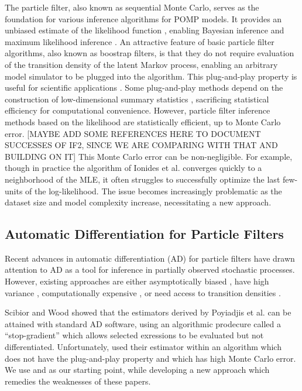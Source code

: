 \documentclass[9pt,twocolumn,twoside]{pnas-new}
\begin{document}
The particle filter, also known as sequential Monte Carlo, serves as the foundation for various inference algorithms for POMP models.
It provides an unbiased estimate of the likelihood function  \cite{delMoral04}, enabling Bayesian inference \cite{andrieu10,chopin13} and maximum likelihood inference \citep{ionides06-pnas,ionides15}.
An attractive feature of basic particle filter algorithms, also known as boostrap filters, is that they do not require evaluation of the transition density of the latent Markov process, enabling an arbitrary model simulator to be plugged into the algorithm.
This plug-and-play property is useful for scientific applications \cite{he10}.
Some plug-and-play methods depend on the construction of low-dimensional summary statistics \cite{wood10,toni09}, sacrificing statistical efficiency for computational convenience.
However, particle filter inference methods based on the likelihood are statistically efficient, up to Monte Carlo error.
[MAYBE ADD SOME REFERENCES HERE TO DOCUMENT SUCCESSES OF IF2, SINCE WE ARE COMPARING WITH THAT AND BUILDING ON IT]
This Monte Carlo error can be non-negligible.
For example, though in practice the algorithm of Ionides et al. \cite{ionides15} converges quickly to a neighborhood of the MLE, it often struggles to successfully optimize the last few-units of the log-likelihood.
The issue becomes increasingly problematic as the dataset size and model complexity increase, necessitating a new approach.

\subsection{Automatic Differentiation for Particle Filters}

Recent advances in automatic differentiation (AD) for particle filters \cite{naesseth18, jonschkowski18, corenflos21, scibior21, singh22} have drawn attention to AD as a tool for inference in partially observed stochastic processes. However, existing approaches are either asymptotically biased \cite{naesseth18, jonschkowski18}, have high variance \cite{poyiadjis11, scibior21}, computationally expensive \cite{corenflos21, chen24}, or need access to transition densities \cite{poyiadjis11, scibior21, singh22, chen24}.

Scibior and Wood \cite{scibior21} showed that the estimators derived by Poyiadjis et al. \cite{poyiadjis11} can be attained with standard AD software, using an algorithmic prodecure called a ``stop-gradient'' which allows selected exressions to be evaluated but not differentiated.
Unfortunately, \cite{scibior21} used their estimator within an algorithm which does not have the plug-and-play property and which has high Monte Carlo error.
We use \cite{scibior21} and \cite{poyiadjis11} as our starting point, while developing a new approach which remedies the weaknesses of these papers.
\end{document}
